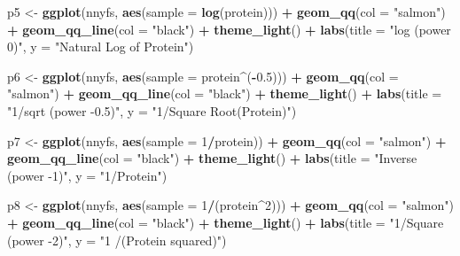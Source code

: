 \documentclass[
]{book}
\newenvironment{Shaded}{\begin{snugshade}}{\end{snugshade}}
\newcommand{\DataTypeTok}[1]{\textcolor[rgb]{0.13,0.29,0.53}{#1}}
\newcommand{\DecValTok}[1]{\textcolor[rgb]{0.00,0.00,0.81}{#1}}
\newcommand{\FloatTok}[1]{\textcolor[rgb]{0.00,0.00,0.81}{#1}}
\newcommand{\KeywordTok}[1]{\textcolor[rgb]{0.13,0.29,0.53}{\textbf{#1}}}
\newcommand{\NormalTok}[1]{#1}
\newcommand{\OperatorTok}[1]{\textcolor[rgb]{0.81,0.36,0.00}{\textbf{#1}}}
\newcommand{\StringTok}[1]{\textcolor[rgb]{0.31,0.60,0.02}{#1}}
\begin{document}
\begin{Shaded}
\begin{Highlighting}[]
\NormalTok{p5 <-}\StringTok{ }\KeywordTok{ggplot}\NormalTok{(nnyfs, }\KeywordTok{aes}\NormalTok{(}\DataTypeTok{sample =} \KeywordTok{log}\NormalTok{(protein))) }\OperatorTok{+}
\StringTok{    }\KeywordTok{geom_qq}\NormalTok{(}\DataTypeTok{col =} \StringTok{"salmon"}\NormalTok{) }\OperatorTok{+}\StringTok{ }
\StringTok{    }\KeywordTok{geom_qq_line}\NormalTok{(}\DataTypeTok{col =} \StringTok{"black"}\NormalTok{) }\OperatorTok{+}
\StringTok{    }\KeywordTok{theme_light}\NormalTok{() }\OperatorTok{+}
\StringTok{    }\KeywordTok{labs}\NormalTok{(}\DataTypeTok{title =} \StringTok{"log (power 0)"}\NormalTok{,}
         \DataTypeTok{y =} \StringTok{"Natural Log of Protein"}\NormalTok{)}

\NormalTok{p6 <-}\StringTok{ }\KeywordTok{ggplot}\NormalTok{(nnyfs, }\KeywordTok{aes}\NormalTok{(}\DataTypeTok{sample =}\NormalTok{ protein}\OperatorTok{^}\NormalTok{(}\OperatorTok{-}\FloatTok{0.5}\NormalTok{))) }\OperatorTok{+}
\StringTok{    }\KeywordTok{geom_qq}\NormalTok{(}\DataTypeTok{col =} \StringTok{"salmon"}\NormalTok{) }\OperatorTok{+}\StringTok{ }
\StringTok{    }\KeywordTok{geom_qq_line}\NormalTok{(}\DataTypeTok{col =} \StringTok{"black"}\NormalTok{) }\OperatorTok{+}
\StringTok{    }\KeywordTok{theme_light}\NormalTok{() }\OperatorTok{+}
\StringTok{    }\KeywordTok{labs}\NormalTok{(}\DataTypeTok{title =} \StringTok{"1/sqrt (power -0.5)"}\NormalTok{,}
         \DataTypeTok{y =} \StringTok{"1/Square Root(Protein)"}\NormalTok{)}


\NormalTok{p7 <-}\StringTok{ }\KeywordTok{ggplot}\NormalTok{(nnyfs, }\KeywordTok{aes}\NormalTok{(}\DataTypeTok{sample =} \DecValTok{1}\OperatorTok{/}\NormalTok{protein)) }\OperatorTok{+}
\StringTok{    }\KeywordTok{geom_qq}\NormalTok{(}\DataTypeTok{col =} \StringTok{"salmon"}\NormalTok{) }\OperatorTok{+}\StringTok{ }
\StringTok{    }\KeywordTok{geom_qq_line}\NormalTok{(}\DataTypeTok{col =} \StringTok{"black"}\NormalTok{) }\OperatorTok{+}
\StringTok{    }\KeywordTok{theme_light}\NormalTok{() }\OperatorTok{+}
\StringTok{    }\KeywordTok{labs}\NormalTok{(}\DataTypeTok{title =} \StringTok{"Inverse (power -1)"}\NormalTok{,}
         \DataTypeTok{y =} \StringTok{"1/Protein"}\NormalTok{)}

\NormalTok{p8 <-}\StringTok{ }\KeywordTok{ggplot}\NormalTok{(nnyfs, }\KeywordTok{aes}\NormalTok{(}\DataTypeTok{sample =} \DecValTok{1}\OperatorTok{/}\NormalTok{(protein}\OperatorTok{^}\DecValTok{2}\NormalTok{))) }\OperatorTok{+}
\StringTok{    }\KeywordTok{geom_qq}\NormalTok{(}\DataTypeTok{col =} \StringTok{"salmon"}\NormalTok{) }\OperatorTok{+}\StringTok{ }
\StringTok{    }\KeywordTok{geom_qq_line}\NormalTok{(}\DataTypeTok{col =} \StringTok{"black"}\NormalTok{) }\OperatorTok{+}
\StringTok{    }\KeywordTok{theme_light}\NormalTok{() }\OperatorTok{+}
\StringTok{    }\KeywordTok{labs}\NormalTok{(}\DataTypeTok{title =} \StringTok{"1/Square (power -2)"}\NormalTok{,}
         \DataTypeTok{y =} \StringTok{"1 /(Protein squared)"}\NormalTok{)}


\end{Highlighting}
\end{Shaded}
\end{document}
